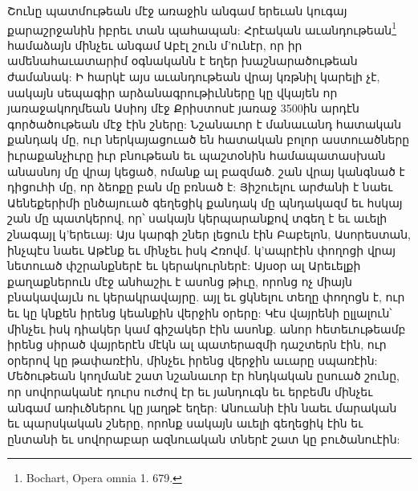 \documentclass{article}
\begin{document}
{Շունը պատմութեան մէջ առաջին անգամ երեւան կուգայ քարաշրջանին իբրեւ տան պահապան: Հրէական աւանդութեան\footnote{Bochart, Opera omnia 1. 679.} համաձայն մինչեւ անգամ Աբէլ շուն մ'ունէր, որ իր ամենահաւատարիմ օգնականն է եղեր խաշնարածութեան ժամանակ: Ի հարկէ այս աւանդութեան վրայ կռթնիլ կարելի չէ, սակայն սեպագիր արձանագրութիւնները կը վկայեն որ յառաջակողմեան Ասիոյ մէջ Քրիստոսէ յառաջ 3500ին արդէն գործածութեան մէջ էին շները: Նշանաւոր է մանաւանդ հատական քանդակ մը, ուր ներկայացուած են հատական բոլոր աստուածները իւրաքանչիւրը իւր բնութեան եւ պաշտօնին համապատասխան անասնոյ մը վրայ կեցած, ոմանք ալ բազմած. շան վրայ կանգնած է դիցուհի մը, որ ձեոքը բան մը բռնած է: Յիշուելու արժանի է նաեւ Աենեքերիմի ընծայուած գեղեցիկ քանդակ մը պնդակազմ եւ հսկայ շան մը պատկերով, որ՝ սակայն կերպարանքով տգեղ է եւ աւելի շնագայլ կ'երեւայ: Այս կարգի շներ լեցուն էին Բաբելոն, Ասորեստան, ինչպէս նաեւ Աթէնք եւ մինչեւ իսկ Հռովմ. կ'ապրէին փողոցի վրայ նետուած փշրանքներէ եւ կերակուրներէ: Այսօր ալ Արեւելքի քաղաքներուն մէջ անհաշիւ է ասոնց թիւը, որոնց ոչ միայն բնակավայւն ու կերակրավայրը. այլ եւ ցկնելու տեղը փողոցն է, ուր եւ կը կնքեն իրենց կեանքին վերջին օրերը: Կէս վայրենի ըլլալուն՝ մինչեւ իսկ դիակեր կամ գիշակեր էին ասոնք. անոր հետեւութեամբ իրենց սիրած վայրերէն մէկն ալ պատերազմի դաշտերն էին, ուր օրերով կը թափառէին, մինչեւ իրենց վերջին աւարը սպառէին: Մեծութեան կողմանէ շատ նշանաւոր էր հնդկական ըսուած շունը, որ սովորականէ դուրս ուժով էր եւ յանդուգն եւ երբեմն մինչեւ անգամ առիւծներու կը յաղթէ եղեր: Անուանի էին նաեւ մարական եւ պարսկական շները, որոնք սակայն աւելի գեղեցիկ էին եւ ընտանի եւ սովորաբար ազնուական տներէ շատ կը բուծանուէին:

}
\end{document}

